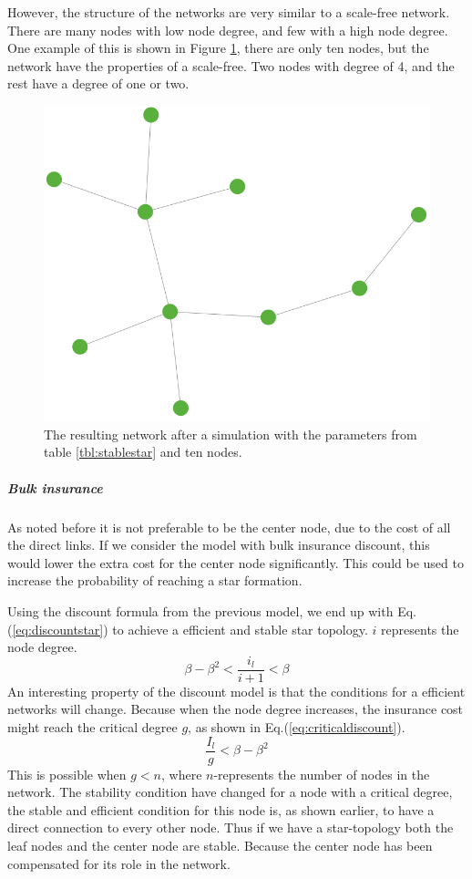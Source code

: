 However, the structure of the networks are very similar to a scale-free network. There are many nodes with low node degree, and few with a high node degree.
One example of this is shown in Figure \ref{fig:stablescalefree}, there are only ten nodes, but the network have the properties of a scale-free. Two nodes with degree of 4, and the rest have a degree of one or two.
\begin{figure}[h]
\centering
  \includegraphics[width=0.5\linewidth]{../Figures/stability/Unefficientbutstabletwo.png}
  \caption{\label{fig:stablescalefree} The resulting network after a simulation with the parameters from table \ref{tbl:stablestar} and ten nodes.}
\end{figure}
\subparagraph{Bulk insurance}
As noted before it is not preferable to be the center node, due to the cost of all the direct links. If we consider the model with bulk insurance discount, this would lower the extra cost for the center node significantly. This could be used to increase the probability of reaching a star formation. 

Using the discount formula from the previous model, we end up with Eq.(\ref{eq:discountstar}) to achieve a efficient and stable star topology. $i$ represents the node degree.
\begin{equation}
\beta-\beta^2<\frac{i_{l}}{i+1}< \beta
\label{eq:discountstar}
\end{equation}
An interesting property of the discount model is that the conditions for a efficient networks will change. Because
when the node degree increases, the insurance cost might reach the critical degree $g$, as shown in Eq.(\ref{eq:criticaldiscount}). 
\begin{equation}
\frac{I_{l}}{g}<\beta-\beta^2
\label{eq:criticaldiscount}
\end{equation}
This is possible when $g<n$, where $n$-represents the number of nodes in the network.
The stability condition have changed for a node with a critical degree, the stable and efficient condition for this node is, as shown earlier, to have a direct connection to every other node. Thus if we have a star-topology both the leaf nodes and the center node are stable. Because the center node has been compensated for its role in the network.

